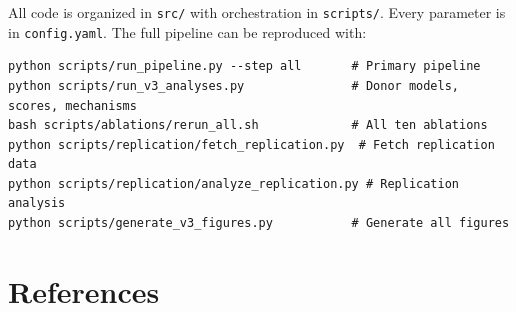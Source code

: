 \documentclass[11pt]{article}
\begin{document}
All code is organized in \texttt{src/} with orchestration in \texttt{scripts/}. Every parameter is in \texttt{config.yaml}. The full pipeline can be reproduced with:

\begin{verbatim}
python scripts/run_pipeline.py --step all       # Primary pipeline
python scripts/run_v3_analyses.py               # Donor models, scores, mechanisms
bash scripts/ablations/rerun_all.sh             # All ten ablations
python scripts/replication/fetch_replication.py  # Fetch replication data
python scripts/replication/analyze_replication.py # Replication analysis
python scripts/generate_v3_figures.py           # Generate all figures
\end{verbatim}


\section{References}
\end{document}
